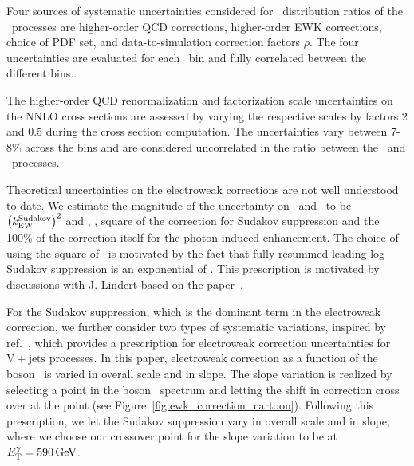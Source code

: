 Four sources of systematic uncertainties considered for \ETg\ distribution ratios of the \vg\ processes are higher-order QCD corrections, higher-order EWK corrections, choice of PDF set, and data-to-simulation correction factors $\rho$. 
The four uncertainties are evaluated for each \ETg\ bin and fully correlated between the different bins.. 

The higher-order QCD renormalization and factorization scale uncertainties on the NNLO cross sections are assessed by varying the respective scales by factors 2 and 0.5 during the cross section computation. 
The uncertainties vary between 7-8\% across the bins and are considered uncorrelated in the ratio between the \zinvg\ and \wlng\ processes.

Theoretical uncertainties on the electroweak corrections are not well understood to date.  
We estimate the magnitude of the uncertainty on \ksudakov\ and \kphoton\ to be $\left(k_{\text{EW}}^{\text{Sudakov}}\right)^2$ and \kphoton, \ie, square of the correction for Sudakov suppression and the 100\% of the correction itself for the photon-induced enhancement. 
The choice of using the square of \ksudakov\ is motivated by the fact that fully resummed leading-log Sudakov suppression is an exponential of \ksudakov.
This prescription is motivated by discussions with J. Lindert based on the paper~\cite{}.

For the Sudakov suppression, which is the dominant term in the electroweak correction, we further consider two types of systematic variations, inspired by ref.~\cite{Lindert:2017olm}, which provides a prescription for electroweak correction uncertainties for $\mathrm{V}+\text{jets}$ processes. 
In this paper, electroweak correction as a function of the boson \pt\ is varied in overall scale and in slope. 
The slope variation is realized by selecting a point in the boson \pt\ spectrum and letting the shift in correction cross over at the point (see Figure~\ref{fig:ewk_correction_cartoon}). 
Following this prescription, we let the Sudakov suppression vary in overall scale and in slope, where we choose our crossover point for the slope variation to be at $E_{\mathrm{T}}^{\gamma}=590\,\text{Ge\hspace{-.08em}V}$.

